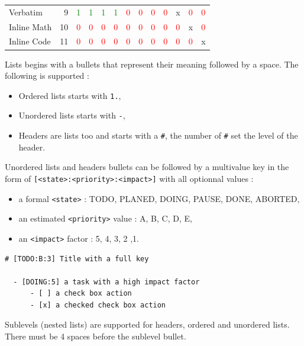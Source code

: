 \documentclass[a4paper,12pt]{article}
\begin{document}
\begin{table}[htbp]
\begin{tabular}{lrlllllllllll}
Verbatim & 9 & \textcolor{green}{1} & \textcolor{green}{1} & \textcolor{green}{1} & \textcolor{green}{1} & \textcolor{red}{0} & \textcolor{red}{0} & \textcolor{red}{0} & \textcolor{red}{0} & x & \textcolor{red}{0} & \textcolor{red}{0}\\
Inline Math & 10 & \textcolor{red}{0} & \textcolor{red}{0} & \textcolor{red}{0} & \textcolor{red}{0} & \textcolor{red}{0} & \textcolor{red}{0} & \textcolor{red}{0} & \textcolor{red}{0} & \textcolor{red}{0} & x & \textcolor{red}{0}\\
Inline Code & 11 & \textcolor{red}{0} & \textcolor{red}{0} & \textcolor{red}{0} & \textcolor{red}{0} & \textcolor{red}{0} & \textcolor{red}{0} & \textcolor{red}{0} & \textcolor{red}{0} & \textcolor{red}{0} & \textcolor{red}{0} & x\\
\hline
\end{tabular}
\end{table}

Lists begins with a bullets that represent their meaning followed by a space. The following is supported :
\begin{itemize}
\item Ordered lists starts with \texttt{1.},
\item Unordered lists starts with \texttt{-},
\item Headers are lists too and starts with a \texttt{\#}, the number of \texttt{\#} set the level of the header.
\end{itemize}

Unordered lists and headers bullets can be followed by a multivalue key in the form of \texttt{[<state>:<priority>:<impact>]} with all optionnal values :
\begin{itemize}
\item a formal \texttt{<state>} : TODO, PLANED, DOING, PAUSE, DONE, ABORTED,
\item an estimated \texttt{<priority>} value : A, B, C, D, E,
\item an \texttt{<impact>} factor : 5, 4, 3, 2 ,1.
\end{itemize}

\begin{verbatim}
# [TODO:B:3] Title with a full key

  - [DOING:5] a task with a high impact factor
      - [ ] a check box action
      - [x] a checked check box action
\end{verbatim}

Sublevels (nested lists) are supported for headers, ordered and unordered lists. There must be 4 spaces before the sublevel bullet.
\end{document}
